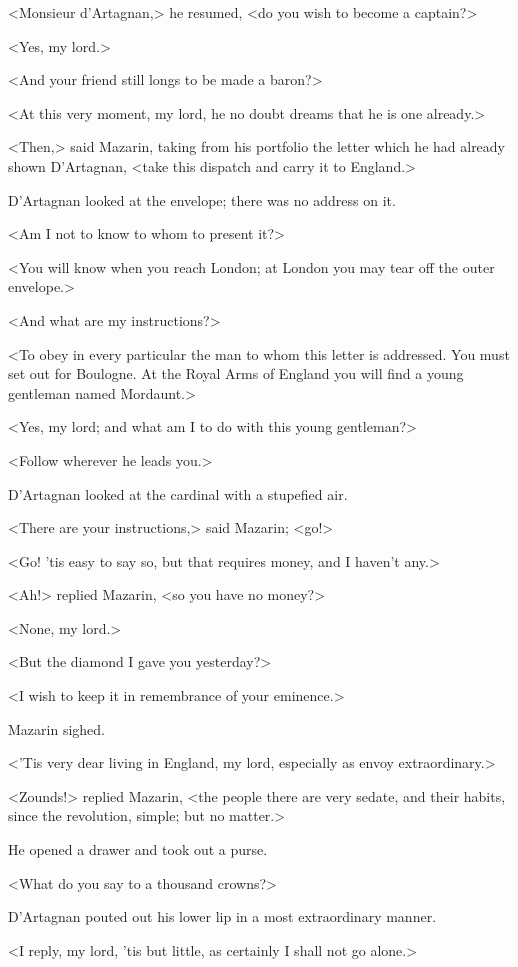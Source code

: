 <Monsieur d'Artagnan,> he resumed, <do you wish to become a captain?>

<Yes, my lord.>

<And your friend still longs to be made a baron?>

<At this very moment, my lord, he no doubt dreams that he is one already.>

<Then,> said Mazarin, taking from his portfolio the letter which he had already shown D'Artagnan, <take this dispatch and carry it to England.>

D'Artagnan looked at the envelope; there was no address on it.

<Am I not to know to whom to present it?>

<You will know when you reach London; at London you may tear off the outer envelope.>

<And what are my instructions?>

<To obey in every particular the man to whom this letter is addressed. You must set out for Boulogne. At the Royal Arms of England you will find a young gentleman named Mordaunt.>

<Yes, my lord; and what am I to do with this young gentleman?>

<Follow wherever he leads you.>

D'Artagnan looked at the cardinal with a stupefied air.

<There are your instructions,> said Mazarin; <go!>

<Go! 'tis easy to say so, but that requires money, and I haven't any.>

<Ah!> replied Mazarin, <so you have no money?>

<None, my lord.>

<But the diamond I gave you yesterday?>

<I wish to keep it in remembrance of your eminence.>

Mazarin sighed.

<'Tis very dear living in England, my lord, especially as envoy extraordinary.>

<Zounds!> replied Mazarin, <the people there are very sedate, and their habits, since the revolution, simple; but no matter.>

He opened a drawer and took out a purse.

<What do you say to a thousand crowns?>

D'Artagnan pouted out his lower lip in a most extraordinary manner.

<I reply, my lord, 'tis but little, as certainly I shall not go alone.>

